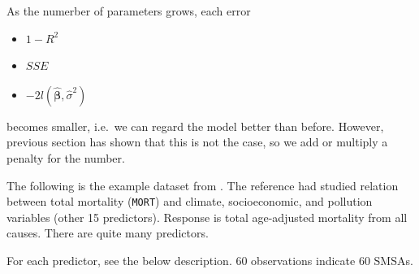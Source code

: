 \documentclass[]{book}
\newenvironment{Shaded}{\begin{snugshade}}{\end{snugshade}}
\newcommand{\CommentTok}[1]{\textcolor[rgb]{0.56,0.35,0.01}{\textit{#1}}}
\newcommand{\KeywordTok}[1]{\textcolor[rgb]{0.13,0.29,0.53}{\textbf{#1}}}
\newcommand{\NormalTok}[1]{#1}
\newcommand{\OperatorTok}[1]{\textcolor[rgb]{0.81,0.36,0.00}{\textbf{#1}}}
\newcommand{\StringTok}[1]{\textcolor[rgb]{0.31,0.60,0.02}{#1}}
\providecommand{\tightlist}{%
  \setlength{\itemsep}{0pt}\setlength{\parskip}{0pt}}
\theoremstyle{definition}
\theoremstyle{definition}
\theoremstyle{definition}
\theoremstyle{remark}
\begin{document}
As the numerber of parameters grows, each error

\begin{itemize}
\tightlist
\item
  \(1 - R^2\)
\item
  \(SSE\)
\item
  \(-2 l(\boldsymbol{\hat\beta}, \hat\sigma^2)\)
\end{itemize}

becomes smaller, i.e.~we can regard the model better than before. However, previous section has shown that this is not the case, so we add or multiply a penalty for the number.

The following is the example dataset from \citet{Chatterjee:2015aa}. The reference had studied relation between total mortality (\texttt{MORT}) and climate, socioeconomic, and pollution variables (other 15 predictors). Response is total age-adjusted mortality from all causes. There are quite many predictors.

\begin{Shaded}
\end{Shaded}

For each predictor, see the below description. 60 observations indicate 60 SMSAs.
\end{document}
